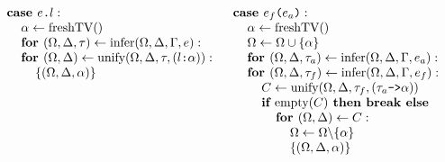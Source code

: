 \documentclass[acmsmall]{acmart}
\begin{document}
\begin{figure*}[h]
\[\begin{array}[t]{@{} l}
    \I \B{case } \code{$e$.$l$} :  
    \\
    \I\I \alpha \leftarrow \F{freshTV}()
    \\
    \I\I \B{for } (\Omega, \Delta, \tau) \leftarrow \F{infer}(\Omega, \Delta, \Gamma, e):
    \\
    \I\I \B{for } (\Omega, \Delta) \leftarrow \F{unify}(\Omega, \Delta, \tau, (\code{$l$:$\alpha$})):
    \\
    \I\I\I \{(\Omega, \Delta, \alpha)\}
\end{array}
\begin{array}[t]{@{} l}
    \I \B{case } \code{$e_f$($e_a$)} :  
    \\
    \I\I \alpha \leftarrow \F{freshTV}()
    \\
    \I\I \Omega \leftarrow \Omega \cup \{\alpha\}
    \\
    \I\I \B{for } (\Omega, \Delta, \tau_a) \leftarrow \F{infer}(\Omega, \Delta, \Gamma, e_a):
    \\
    \I\I \B{for } (\Omega, \Delta, \tau_f) \leftarrow \F{infer}(\Omega, \Delta, \Gamma, e_f):
    \\
    \I\I\I C \leftarrow \F{unify}(\Omega, \Delta, \tau_f, (\code{$\tau_a$->$\alpha$}))
    \\
    \I\I\I \B{if } \F{empty}(C) \B{ then } \B{break} \B{ else }
    \\
    \I\I\I\I \B{for } (\Omega, \Delta) \leftarrow C:
    \\
    \I\I\I\I\I \Omega \leftarrow \Omega \backslash \{\alpha\}
    \\
    \I\I\I\I\I \{(\Omega, \Delta, \alpha)\}

    \\


\end{array}\]
\end{figure*}
\end{document}
